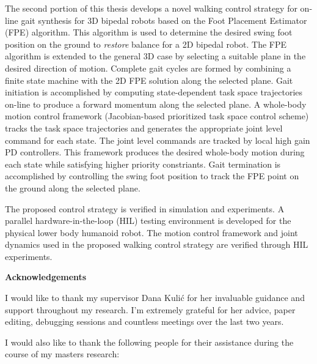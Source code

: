 The second portion of this thesis develops a novel walking control strategy for on-line gait synthesis for 3D bipedal robots based on the Foot Placement Estimator (FPE) algorithm. This algorithm is used to determine the desired swing foot position on the ground to \emph{restore} balance for a 2D bipedal robot. The FPE algorithm is extended to the general 3D case by selecting a suitable plane in the desired direction of motion. Complete gait cycles are formed by combining a finite state machine with the 2D FPE solution along the selected plane. Gait initiation is accomplished by computing state-dependent task space trajectories on-line to produce a forward momentum along the selected plane. A whole-body motion control framework (Jacobian-based prioritized task space control scheme) tracks the task space trajectories and generates the appropriate joint level command for each state. The joint level commands are tracked by local high gain PD controllers. This framework produces the desired whole-body motion during each state while satisfying higher priority constriants. Gait termination is accomplished by controlling the swing foot position to track the FPE point on the ground along the selected plane. 

The proposed control strategy is verified in simulation and experiments. A parallel hardware-in-the-loop (HIL) testing environment is developed for the physical lower body humanoid robot. The motion control framework and joint dynamics used in the proposed walking control strategy are verified through HIL experiments.

\cleardoublepage


\begin{center}
    \textbf{Acknowledgements}
\end{center}

I would like to thank my supervisor Dana Kuli\'{c} for her invaluable guidance and support throughout my research. I'm extremely grateful for her advice, paper editing, debugging sessions and countless meetings over the last two years.  

I would also like to thank the following people for their assistance during the course of my masters research: 

